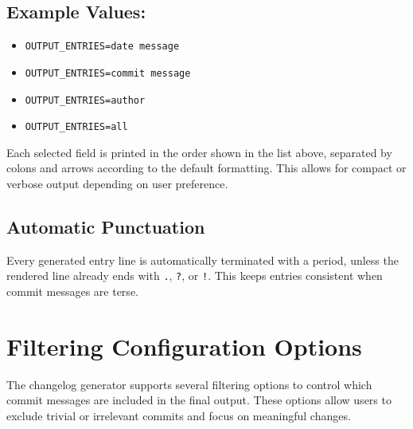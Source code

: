 \subsection*{Example Values:}
\begin{itemize}
	\item \texttt{OUTPUT\_ENTRIES=date message}
	\item \texttt{OUTPUT\_ENTRIES=commit message}
	\item \texttt{OUTPUT\_ENTRIES=author}
	\item \texttt{OUTPUT\_ENTRIES=all}
\end{itemize}

Each selected field is printed in the order shown in the list above, separated by colons and arrows according to the default formatting. This allows for compact or verbose output depending on user preference.

\subsection*{Automatic Punctuation}
Every generated entry line is automatically terminated with a period, unless the rendered line already ends with \texttt{.}, \texttt{?}, or \texttt{!}. This keeps entries consistent when commit messages are terse.














\section{Filtering Configuration Options}
\label{section:filtering}

The changelog generator supports several filtering options to control which commit messages are included in the final output. These options allow users to exclude trivial or irrelevant commits and focus on meaningful changes.

